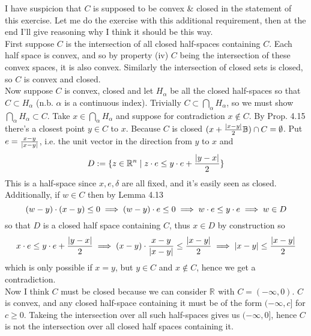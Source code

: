 \documentclass{article}
\newenvironment{ex}[1]
  {\renewcommand\theexercise{#1}\exercise}
  {\endexercise}
\newcommand{\B}{\mathbb{B}}
\newcommand{\R}[1]{\mathbb{R}^{#1}}
\begin{document}
\begin{ex}{4.17} %
  I have suspicion that $C$ is supposed to be convex \& closed in the statement of this exercise. Let me do the exercise with this additional requirement, then at the end I'll give reasoning why I think it should be this way. \, \\

  First suppose $C$ is the intersection of all closed half-spaces containing $C$. Each half space is convex, and so by property (iv) $C$ being the intersection of these convex spaces, it is also convex. Similarly the intersection of closed sets is closed, so $C$ is convex and closed. \, \\

  Now suppose $C$ is convex, closed and let $H_\alpha$ be all the closed half-spaces so that $C \subset H_\alpha$ (n.b. $\alpha$ is a continuous index). Trivially $C \subset \bigcap_\alpha H_\alpha$, so we must show $\bigcap_\alpha H_\alpha \subset C$. Take $x \in \bigcap_\alpha H_\alpha$ and suppose for contradiction $x \not\in C$. By Prop. 4.15 there's a closest point $y \in C$ to $x$. Because $C$ is closed $\parens{x + \frac{\abs{x-y}}{2} \B} \cap C = \emptyset$. Put $e = \frac{x-y}{\lvert x-y\rvert}$, i.e. the unit vector in the direction from $y$ to $x$ and
  $$
  D := \braces{ z \in \R{n} \mid z \cdot e \le y \cdot e + \frac{\abs{y-x}}{2} }
  $$
  This is a half-space since $x, e, \delta$ are all fixed, and it's easily seen as closed. Additionally, if $w \in C$ then by Lemma 4.13
  $$
  (w - y) \cdot (x - y) \le 0 \implies (w - y) \cdot e \le 0 \implies w \cdot e \le y \cdot e \implies w \in D
  $$
  so that $D$ is a closed half space containing $C$, thus $x \in D$ by construction so
  $$
  x \cdot e \le y \cdot e + \frac{\lvert y - x\rvert}{2} \implies (x - y) \cdot \frac{x - y}{\lvert x-y\rvert} \le \frac{\lvert x - y\rvert}{2} \implies \lvert x - y\rvert \le \frac{\lvert x - y\rvert}{2}
  $$
  which is only possible if $x = y$, but $y \in C$ and $x \not\in C$, hence we get a contradiction. \, \\

  Now I think $C$ must be closed because we can consider $\R{}$ with $C = (-\infty, 0)$. $C$ is convex, and any closed half-space containing it must be of the form $(-\infty, c]$ for $c \ge 0$. Takeing the intersection over all such half-spaces gives us $(-\infty, 0]$, hence $C$ is not the intersection over all closed half spaces containing it.
\end{ex} %
\end{document}

